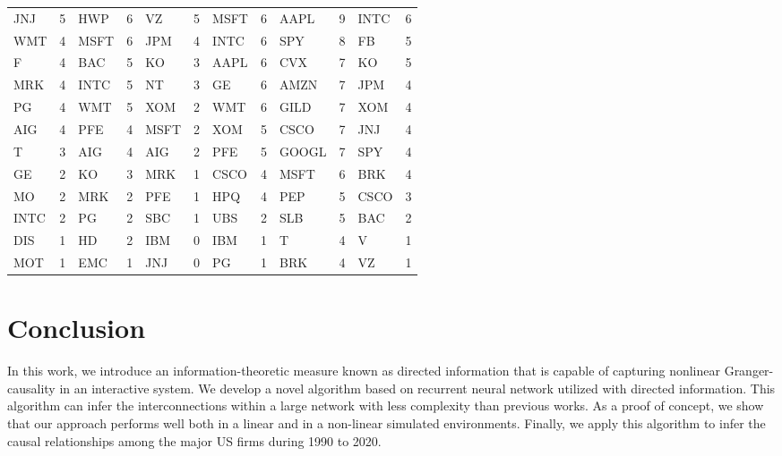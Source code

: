 \begin{table}[]
{\begin{tabular}{|ll|ll|ll|ll|ll|ll|}
JNJ  & 5  & HWP  & 6  & VZ   & 5  & MSFT & 6  & AAPL  & 9  & INTC  & 6  \\
WMT  & 4  & MSFT & 6  & JPM  & 4  & INTC & 6  & SPY   & 8  & FB    & 5  \\
F    & 4  & BAC  & 5  & KO   & 3  & AAPL & 6  & CVX   & 7  & KO    & 5  \\
MRK  & 4  & INTC & 5  & NT   & 3  & GE   & 6  & AMZN  & 7  & JPM   & 4  \\
PG   & 4  & WMT  & 5  & XOM  & 2  & WMT  & 6  & GILD  & 7  & XOM   & 4  \\
AIG  & 4  & PFE  & 4  & MSFT & 2  & XOM  & 5  & CSCO  & 7  & JNJ   & 4  \\
T    & 3  & AIG  & 4  & AIG  & 2  & PFE  & 5  & GOOGL & 7  & SPY   & 4  \\
GE   & 2  & KO   & 3  & MRK  & 1  & CSCO & 4  & MSFT  & 6  & BRK   & 4  \\
MO   & 2  & MRK  & 2  & PFE  & 1  & HPQ  & 4  & PEP   & 5  & CSCO  & 3  \\
INTC & 2  & PG   & 2  & SBC  & 1  & UBS  & 2  & SLB   & 5  & BAC   & 2  \\
DIS  & 1  & HD   & 2  & IBM  & 0  & IBM  & 1  & T     & 4  & V     & 1  \\
MOT  & 1  & EMC  & 1  & JNJ  & 0  & PG   & 1  & BRK   & 4  & VZ    & 1  \\ \hline
\end{tabular}}
\label{indegree}
\end{table}

\section{Conclusion}\label{sec:con}

In this work, we introduce an information-theoretic measure known as directed information that is capable of capturing nonlinear Granger-causality in an interactive system. 
We develop a novel algorithm based on recurrent neural network utilized with directed information. 
This algorithm can infer the interconnections within a large network with less complexity than previous works. As a proof of concept, we show that our approach performs well both in a linear and in a non-linear simulated environments. Finally, we apply this algorithm to infer the causal relationships among the major US firms during 1990 to 2020. 

 
 




